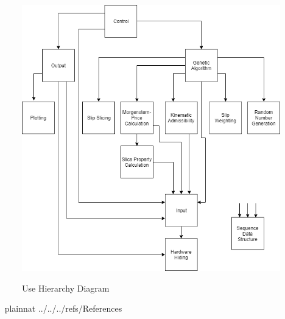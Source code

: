 \documentclass[12pt, titlepage]{article}
\begin{document}
\begin{figure}[h!]
\begin{center}
{
 \includegraphics[width=1.1\textwidth]{UseHierarchyDiagram.png}
}
\caption{Use Hierarchy Diagram}
\label{Fig_Use}
\end{center}
\end{figure}
~\newpage
 {plainnat}
 {../../../refs/References}
\end{document}
